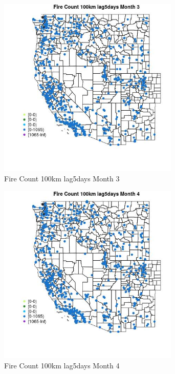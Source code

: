 \begin{figure} 
\centering  
\includegraphics[width=0.77\textwidth]{Code_Outputs/Report_ML_input_PM25_Step4_part_f_de_duplicated_aves_prioritize_24hr_obswNAs_MapObsMo3Fire_Count_100km_lag5days.jpg} 
\caption{\label{fig:Report_ML_input_PM25_Step4_part_f_de_duplicated_aves_prioritize_24hr_obswNAsMapObsMo3Fire_Count_100km_lag5days}Fire Count 100km lag5days Month 3} 
\end{figure} 
 

\clearpage 

\begin{figure} 
\centering  
\includegraphics[width=0.77\textwidth]{Code_Outputs/Report_ML_input_PM25_Step4_part_f_de_duplicated_aves_prioritize_24hr_obswNAs_MapObsMo4Fire_Count_100km_lag5days.jpg} 
\caption{\label{fig:Report_ML_input_PM25_Step4_part_f_de_duplicated_aves_prioritize_24hr_obswNAsMapObsMo4Fire_Count_100km_lag5days}Fire Count 100km lag5days Month 4} 
\end{figure} 
 

